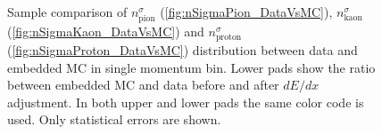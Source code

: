 \begin{figure}[b!]
{\begin{subfigure}[b]{\linewidth}
  \end{subfigure}
}%
\quad\quad%
\parbox{0.4725\textwidth}{
  \centering
  \begin{subfigure}[b]{\linewidth}\addtocounter{subfigure}{-2}
  \end{subfigure}\\[5pt]
  \begin{minipage}[t][0.78\linewidth][t]{\linewidth}\vspace{10pt}
    \caption[Sample comparison of $n^{\sigma}_{\text{pion}}$, $n^{\sigma}_{\text{kaon}}$ and $n^{\sigma}_{\text{proton}}$ distribution between data and embedded MC in single momentum bin.]%
    {Sample comparison of $n^{\sigma}_{\text{pion}}$ (\ref{fig:nSigmaPion_DataVsMC}), $n^{\sigma}_{\text{kaon}}$ (\ref{fig:nSigmaKaon_DataVsMC}) and $n^{\sigma}_{\text{proton}}$ (\ref{fig:nSigmaProton_DataVsMC}) distribution between data and embedded MC in single momentum bin. Lower pads show the ratio between embedded MC and data before and after $dE/dx$ adjustment. In both upper and lower pads the same color code is used. Only statistical errors are shown.}\label{fig:nSigma_DataVsMC}
  \end{minipage}
}
\end{figure}
